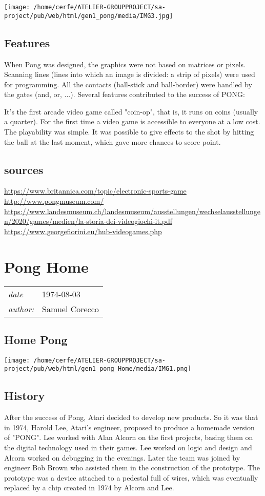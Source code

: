 \documentclass[a4paper,10pt]{book}
\newcommand{\pageHeader}[4]{
    \section{#1}
    \vspace{-0.3cm}
    \begin{table}[h!]
     \begin{tabular}{ll}
        \hline
        \textit{date} & #2 \\
        \textit{author: } & #3\\
        \hline
     \end{tabular}
    \end{table}
    \vspace{-0.3cm}
}
\begin{document}
 
 \texttt{[image: /home/cerfe/ATELIER-GROUPPROJECT/sa-project/pub/web/html/gen1\_pong/media/IMG3.jpg]}
 
 
 
 
 \subsection{Features }
 When Pong was designed, the graphics were not based on matrices or pixels. Scanning lines (lines into which an image is divided: a strip of pixels) were used for programming. All the contacts (ball-stick and ball-border) were handled by the gates (and, or, ...). Several features contributed to the success of PONG:
 
 
 It's the first arcade video game called "coin-op", that is, it runs on coins (usually a quarter). 
 For the first time a video game is accessible to everyone at a low cost. The playability was simple.   
 It was possible to give effects to the shot by hitting the ball at the last moment, which gave more chances to score point. 
 
 \subsection{sources }
 
 \href{https://www.britannica.com/topic/electronic-sports-game}{https://www.britannica.com/topic/electronic-sports-game }
 \href{http://www.pongmuseum.com/}{http://www.pongmuseum.com/ }
 \href{https://www.landesmuseum.ch/landesmuseum/ausstellungen/wechselausstellungen/2020/games/medien/la-storia-dei-videogiochi-it.pdf}{https://www.landesmuseum.ch/landesmuseum/ausstellungen/wechselausstellungen/2020/games/medien/la-storia-dei-videogiochi-it.pdf }
 \href{https://www.georgefiorini.eu/hub-videogames.php}{https://www.georgefiorini.eu/hub-videogames.php }
 
 \newpage\pageHeader{Pong Home}{1974-08-03}{Samuel Corecco}{A page about the console Pong Home}
 \subsection{Home Pong }
     
 \texttt{[image: /home/cerfe/ATELIER-GROUPPROJECT/sa-project/pub/web/html/gen1\_pong\_Home/media/IMG1.png]}
 
 
 \subsection{History }
 After the success of Pong, Atari decided to develop new products. So it was that in 1974, Harold Lee, Atari's engineer, proposed to produce a homemade version of "PONG". Lee worked with Alan Alcorn on the first projects, basing them on the digital technology used in their games. Lee worked on logic and design and Alcorn worked on debugging in the evenings. Later the team was joined by engineer Bob Brown who assisted them in the construction of the prototype. The prototype was a device attached to a pedestal full of wires, which was eventually replaced by a chip created in 1974 by Alcorn and Lee.
           
\end{document}
